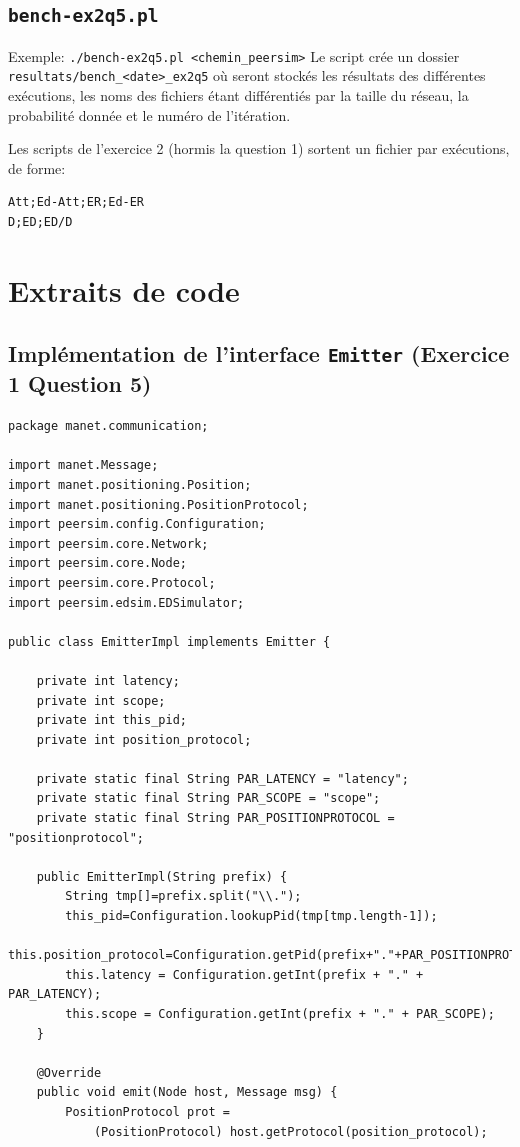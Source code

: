 \documentclass[a4paper]{article}
\begin{document}
\begin{appendix}
\subsection{\texttt{bench-ex2q5.pl}}
Exemple: \texttt{./bench-ex2q5.pl <chemin\_peersim>}
Le script crée un dossier \texttt{resultats/bench\_<date>\_ex2q5} où
seront stockés les résultats des différentes exécutions, les noms des
fichiers étant différentiés par la taille du réseau, la probabilité
donnée et le numéro de l'itération.

Les scripts de l'exercice 2 (hormis la question 1) sortent un fichier
par exécutions, de forme:
\begin{verbatim}
Att;Ed-Att;ER;Ed-ER
D;ED;ED/D
\end{verbatim}


\section{Extraits de code}
\subsection{Implémentation de l'interface \texttt{Emitter} (Exercice 1
  Question 5)}
\begin{lstlisting}
package manet.communication;

import manet.Message;
import manet.positioning.Position;
import manet.positioning.PositionProtocol;
import peersim.config.Configuration;
import peersim.core.Network;
import peersim.core.Node;
import peersim.core.Protocol;
import peersim.edsim.EDSimulator;

public class EmitterImpl implements Emitter {

    private int latency;
    private int scope;
    private int this_pid;
    private int position_protocol;

    private static final String PAR_LATENCY = "latency";
    private static final String PAR_SCOPE = "scope";
    private static final String PAR_POSITIONPROTOCOL = "positionprotocol";

    public EmitterImpl(String prefix) {
        String tmp[]=prefix.split("\\.");
        this_pid=Configuration.lookupPid(tmp[tmp.length-1]);
        this.position_protocol=Configuration.getPid(prefix+"."+PAR_POSITIONPROTOCOL);
        this.latency = Configuration.getInt(prefix + "." + PAR_LATENCY);
        this.scope = Configuration.getInt(prefix + "." + PAR_SCOPE);
    }

    @Override
    public void emit(Node host, Message msg) {
        PositionProtocol prot =
            (PositionProtocol) host.getProtocol(position_protocol);


\end{lstlisting}
\end{appendix}
\end{document}
